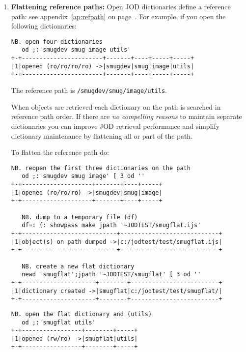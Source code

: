 \begin{enumerate}

\item \textbf{Flattening reference paths:} Open JOD dictionaries define a reference path: see appendix~\ref{ap:refpath} on page~\pageref{ap:refpath}.
For example, if you open the following dictionaries:

\begin{lstlisting}[frame=single,framerule=0pt,basicstyle=\ttfamily\footnotesize]
   NB. open four dictionaries
   od ;:'smugdev smug image utils'
+-+-----------------------+-------+----+-----+-----+
|1|opened (ro/ro/ro/ro) ->|smugdev|smug|image|utils|
+-+-----------------------+-------+----+-----+-----+
\end{lstlisting}

The reference path is \texttt{/smugdev/smug/image/utils}.

When objects are retrieved each dictionary on the path is searched in reference path order.
If there are \emph{no compelling reasons} to maintain separate dictionaries you can improve
JOD retrieval performance and simplify dictionary maintenance by flattening all or part of the path. 

To flatten the reference path do:

\begin{lstlisting}[frame=single,framerule=0pt,basicstyle=\ttfamily\footnotesize]
   NB. reopen the first three dictionaries on the path
   od ;:'smugdev smug image' [ 3 od ''
+-+--------------------+-------+----+-----+
|1|opened (ro/ro/ro) ->|smugdev|smug|image|
+-+--------------------+-------+----+-----+

   NB. dump to a temporary file (df)
   df=: {: showpass make jpath '~JODTEST/smugflat.ijs'
+-+---------------------------+----------------------------+
|1|object(s) on path dumped ->|c:/jodtest/test/smugflat.ijs|
+-+---------------------------+----------------------------+

   NB. create a new flat dictionary
   newd 'smugflat';jpath '~JODTEST/smugflat' [ 3 od ''
+-+---------------------+--------+-------------------------+
|1|dictionary created ->|smugflat|c:/jodtest/test/smugflat/|
+-+---------------------+--------+-------------------------+
\end{lstlisting}

\newpage

\begin{lstlisting}[frame=single,framerule=0pt,basicstyle=\ttfamily\footnotesize]
   NB. open the flat dictionary and (utils)
   od ;:'smugflat utils'
+-+-----------------+--------+-----+
|1|opened (rw/ro) ->|smugflat|utils|
+-+-----------------+--------+-----+
  

\end{lstlisting}
\end{enumerate}

